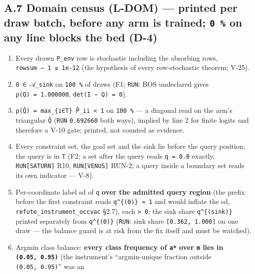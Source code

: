 \documentclass[11pt,a4paper]{article}
\theoremstyle{plain}
\theoremstyle{definition}
\theoremstyle{remark}
\providecommand{\tightlist}{%
  \setlength{\itemsep}{0pt}\setlength{\parskip}{0pt}}
\begin{document}
\subsection{\texorpdfstring{A.7 Domain census (L-DOM) --- printed per
draw batch, before any arm is trained; \texttt{0\ \%} on any line blocks
the bed
(D-4)}{A.7 Domain census (L-DOM) --- printed per draw batch, before any arm is trained; 0 \% on any line blocks the bed (D-4)}}\label{a.7-domain-census-l-dom-printed-per-draw-batch-before-any-arm-is-trained-0-on-any-line-blocks-the-bed-d-4}

\begin{enumerate}
\def\labelenumi{\arabic{enumi}.}
\tightlist
\item
  Every drawn \texttt{P\_env} row is stochastic including the absorbing
  rows, \texttt{\textbar{}rowsum\ −\ 1\textbar{}\ ≤\ 1e-12} (the
  hypothesis of every row-stochastic theorem; V-25).
\item
  \texttt{0\ ∈\ 𝒜\_sink} on \texttt{100\ \%} of draws (F1; \texttt{RUN}:
  BOS undeclared gives \texttt{ρ(Q)\ =\ 1.000000},
  \texttt{det(I\ −\ Q)\ =\ 0}).
\item
  \texttt{ρ(Q̂)\ =\ max\_\{i∈T\}\ P̂\_ii\ \textless{}\ 1} on
  \texttt{100\ \%} --- a diagonal read on the arm's triangular
  \texttt{Q̂} (\texttt{RUN} \texttt{0.692660} both ways), implied by line
  2 for finite logits and therefore a V-10 gate; printed, not counted as
  evidence.
\item
  Every constraint set, the goal set and the sink lie before the query
  position; the query is in \texttt{T} (F2; a set after the query reads
  \texttt{q\ =\ 0.0} exactly, \texttt{RUN{[}SATURN{]}} R10,
  \texttt{RUN{[}VENUS{]}} RUN-2; a query inside a boundary set reads its
  own indicator --- V-8).
\item
  Per-coordinate label sd of \texttt{q} \textbf{over the admitted query
  region} (the prefix before the first constraint reads
  \texttt{q\^{}\{(0)\}\ ≈\ 1} and would inflate the sd,
  \texttt{refute\_instrument\_occvac} §2.7), each
  \texttt{\textgreater{}\ 0}; the sink share \texttt{q\^{}\{(sink)\}}
  printed separately from \texttt{q\^{}\{(0)\}} (\texttt{RUN}: sink
  share \texttt{{[}0.362,\ 1.000{]}} on one draw --- the balance guard
  is at risk from the fix itself and must be watched).
\item
  Argmin class balance: \textbf{every class frequency of \texttt{a*}
  over \texttt{m} lies in \texttt{(0.05,\ 0.95)}} (the instrument's
  ``argmin-unique fraction outside \texttt{(0.05,\ 0.95)}'' was an

\end{enumerate}
\end{document}
